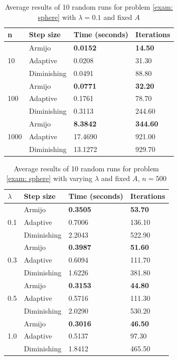 \documentclass[pdflatex,sn-mathphys-num]{sn-jnl}%
\theoremstyle{definition} %
\theoremstyle{remark} %
\begin{document}
\begin{table}[h]
    \centering
    \caption{Average results of 10 random runs for problem \eqref{exam: sphere}  with \( \lambda = 0.1 \) and fixed $A$}
    \begin{tabular}{l p{2.5cm} p{2.5cm} p{2.5cm}}
        \toprule
          n & Step size & Time (seconds) & Iterations \\
        \midrule
        \multirow{3}{*}{10} 
          & Armijo & \textbf{0.0152} & \textbf{14.50} \\
          & Adaptive & 0.0208 & 31.30 \\
          & Diminishing & 0.0491 & 88.80 \\
        \midrule
        \multirow{3}{*}{100} 
          & Armijo & \textbf{0.0771} & \textbf{32.20} \\
          & Adaptive & 0.1761 & 78.70 \\
          & Diminishing & 0.3113 & 244.60 \\
        \midrule
        \multirow{3}{*}{1000} 
          & Armijo & \textbf{8.3842} & \textbf{344.60} \\
          & Adaptive & 17.4690 & 921.00 \\
          & Diminishing & 13.1272 & 929.70 \\
        \bottomrule
    \end{tabular}    
    \label{table 1}
\end{table}
\begin{table}[htbp]
    \centering
    \caption{Average results of 10 random runs for problem \eqref{exam: sphere} with varying \( \lambda \) and fixed $A$, \( n = 500 \)}
    \begin{tabular}{l p{2.5cm} p{2.5cm} p{2.5cm}}
        \toprule
        \( \lambda \) & Step size & Time (seconds) & Iterations \\
        \midrule
        \multirow{3}{*}{0.1} 
          & Armijo & \textbf{0.3505} & \textbf{53.70} \\
          & Adaptive & 0.7006 & 136.10 \\
          & Diminishing & 2.2043 & 522.90 \\
        \midrule
        \multirow{3}{*}{0.3} 
          & Armijo & \textbf{0.3987} & \textbf{51.60} \\
          & Adaptive & 0.6094 & 111.70 \\
          & Diminishing & 1.6226 & 381.80 \\
        \midrule
        \multirow{3}{*}{0.5} 
          & Armijo & \textbf{0.3153} & \textbf{44.80} \\
          & Adaptive & 0.5716 & 111.30 \\
          & Diminishing & 2.0290 & 530.20 \\
        \midrule
        \multirow{3}{*}{1.0} 
          & Armijo & \textbf{0.3016} & \textbf{46.50} \\
          & Adaptive & 0.5137 & 97.30 \\
          & Diminishing & 1.8412 & 465.50 \\
        \bottomrule
    \end{tabular}    
    \label{table:lambda_results}
\end{table}
\end{document}
